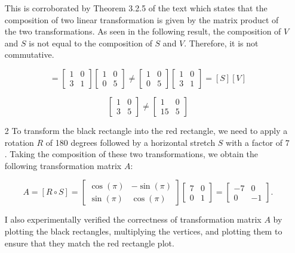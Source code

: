 \documentclass[10pt]{article}
\begin{document}
\begin{enumerate}[leftmargin=\labelsep]
    This is corroborated by Theorem 3.2.5 of the text which states that the composition of two linear transformation is given by the matrix product of the two transformations. As seen in the following result, the composition of $V$ and $S$ is not equal to the composition of $S$ and $V$. Therefore, it is not commutative.
    
    \begin{equation*}
    [V][S] = 
        \begin{bmatrix} 
            1 & 0 \\ 3 & 1 
        \end{bmatrix}
        \begin{bmatrix} 
            1 & 0 \\ 0 & 5 
        \end{bmatrix}
        \neq
        \begin{bmatrix}
            1 & 0 \\ 0 & 5 
        \end{bmatrix} 
        \begin{bmatrix} 
            1 & 0 \\ 
            3 & 1 
        \end{bmatrix}
    = [S][V]
    \end{equation*}
    
    \begin{equation*}
        \begin{bmatrix}
            1 & 0 \\
            3 & 5
        \end{bmatrix}
        \neq
        \begin{bmatrix}
            1 & 0 \\
            15 & 5
        \end{bmatrix}
    \end{equation*}

    \item[2] To transform the black rectangle into the red rectangle, we need to apply a rotation $R$ of 180 degrees followed by a horizontal stretch $S$ with a factor of $7$. Taking the composition of these two transformations, we obtain the following transformation matrix $A$:

    \[ A = [R \circ S]
    = 
    \begin{bmatrix}
        \cos(\pi) & - \sin(\pi) \\
        \sin(\pi) & \cos(\pi)
    \end{bmatrix} 
    \begin{bmatrix}
        7 & 0 \\
        0 & 1
    \end{bmatrix} 
    = 
    \begin{bmatrix}
        -7 & 0 \\
        0 & -1
    \end{bmatrix}. 
    \]
    
    I also experimentally verified the correctness of transformation matrix $A$ by plotting the black rectangles, multiplying the vertices, and plotting them to ensure that they match the red rectangle plot.
\end{enumerate}
\end{document}
